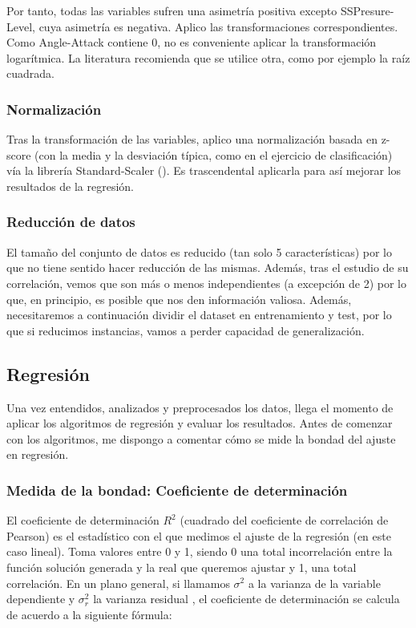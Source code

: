 Por tanto, todas las variables sufren una asimetría positiva excepto SSPresure-Level, cuya asimetría es negativa. Aplico las transformaciones correspondientes. Como Angle-Attack contiene 0, no es conveniente aplicar la transformación logarítmica. La literatura recomienda que se utilice otra, como por ejemplo la raíz cuadrada.

\subsubsection{Normalización}

Tras la transformación de las variables, aplico una normalización basada en z-score (con la media y la desviación típica, como en el ejercicio de clasificación) vía la librería Standard-Scaler (\cite{st-sc}). Es trascendental aplicarla para así mejorar los resultados de la regresión.


\subsubsection{Reducción de datos}

El tamaño del conjunto de datos es reducido (tan solo 5 características) por lo que no tiene sentido hacer reducción de las mismas. Además, tras el estudio de su correlación, vemos que son más o menos independientes (a excepción de 2) por lo que, en principio, es posible que nos den información valiosa. Además, necesitaremos a continuación dividir el dataset en entrenamiento y test, por lo que si reducimos instancias, vamos a perder capacidad de generalización.

\subsection{Regresión}

Una vez entendidos, analizados y preprocesados los datos, llega el momento de aplicar los algoritmos de regresión y evaluar los resultados. Antes de comenzar con los algoritmos, me dispongo a comentar cómo se mide la bondad del ajuste en regresión.

\subsubsection{Medida de la bondad: Coeficiente de determinación}

El coeficiente de determinación $R^2$ \cite{rcuadrado} (cuadrado del coeficiente de correlación de Pearson) es el estadístico con el que medimos el ajuste de la regresión (en este caso lineal). Toma valores entre 0 y 1, siendo 0 una total incorrelación entre la función solución generada y la real que queremos ajustar y 1, una total correlación. En un plano general, si llamamos $\sigma^2$ a la varianza de la variable dependiente y $\sigma^2_r$ la varianza residual \cite{var-res}, el coeficiente de determinación se calcula de acuerdo a la siguiente fórmula:

